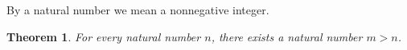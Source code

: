 \documentclass{article}
\newtheorem{theorem}{Theorem}
\begin{document}
By a natural number we mean a nonnegative integer.
\begin{theorem}\label{thm:E07}
For every natural number $n$, there exists a natural number $m>n$.
\end{theorem}
\end{document}
